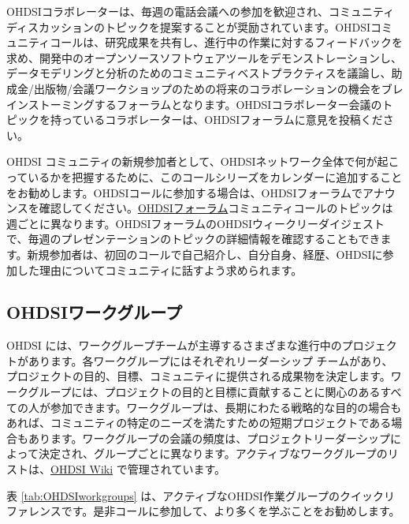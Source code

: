 \documentclass[
  11pt]{book}
\theoremstyle{definition}
\theoremstyle{definition}
\theoremstyle{definition}
\theoremstyle{definition}
\theoremstyle{remark}
\begin{document}
OHDSIコラボレーターは、毎週の電話会議への参加を歓迎され、コミュニティディスカッションのトピックを提案することが奨励されています。OHDSIコミュニティコールは、研究成果を共有し、進行中の作業に対するフィードバックを求め、開発中のオープンソースソフトウェアツールをデモンストレーションし、データモデリングと分析のためのコミュニティベストプラクティスを議論し、助成金/出版物/会議ワークショップのための将来のコラボレーションの機会をブレインストーミングするフォーラムとなります。OHDSIコラボレーター会議のトピックを持っているコラボレーターは、OHDSIフォーラムに意見を投稿ください。

OHDSI コミュニティの新規参加者として、OHDSIネットワーク全体で何が起こっているかを把握するために、このコールシリーズをカレンダーに追加することをお勧めします。OHDSIコールに参加する場合は、OHDSIフォーラムでアナウンスを確認してください。\href{https://forums.ohdsi.org/}{OHDSIフォーラム}コミュニティコールのトピックは週ごとに異なります。OHDSIフォーラムのOHDSIウィークリーダイジェストで、毎週のプレゼンテーションのトピックの詳細情報を確認することもできます。新規参加者は、初回のコールで自己紹介し、自分自身、経歴、OHDSIに参加した理由についてコミュニティに話すよう求められます。

\subsection{OHDSIワークグループ}\label{ohdsiux30efux30fcux30afux30b0ux30ebux30fcux30d7}

OHDSI には、ワークグループチームが主導するさまざまな進行中のプロジェクトがあります。各ワークグループにはそれぞれリーダーシップ チームがあり、プロジェクトの目的、目標、コミュニティに提供される成果物を決定します。ワークグループには、プロジェクトの目的と目標に貢献することに関心のあるすべての人が参加できます。ワークグループは、長期にわたる戦略的な目的の場合もあれば、コミュニティの特定のニーズを満たすための短期プロジェクトである場合もあります。ワークグループの会議の頻度は、プロジェクトリーダーシップによって決定され、グループごとに異なります。アクティブなワークグループのリストは、\href{https://www.ohdsi.org/web/wiki/doku.php?id=projects:overview}{OHDSI Wiki} で管理されています。

表 \ref{tab:OHDSIworkgroups} は、アクティブなOHDSI作業グループのクイックリファレンスです。是非コールに参加して、より多くを学ぶことをお勧めします。
\end{document}
